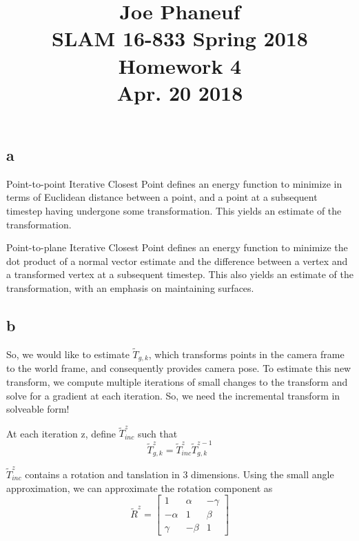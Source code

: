 \documentclass[12pt]{article}
\begin{document}
\title{Joe Phaneuf \\ SLAM 16-833 Spring 2018 Homework 4 \\ Apr. 20 2018 }
\date{}
\author{}
\maketitle

\newpage


\section{}
\subsection{a}
Point-to-point Iterative Closest Point defines an energy function to minimize in terms of Euclidean distance between a point, and a point at a subsequent timestep having undergone some transformation. This yields an estimate of the transformation. 

Point-to-plane Iterative Closest Point defines an energy function to minimize the dot product of a normal vector estimate and the difference between a vertex and a transformed vertex at a subsequent timestep. This also yields an estimate of the transformation, with an emphasis on maintaining surfaces.

\subsection{b}
So, we would like to estimate $\tilde{T}_{g,k}$, which transforms points in the camera frame to the world frame, and consequently provides camera pose.  
To estimate this new transform, we compute multiple iterations of small changes to the transform and solve for a gradient at each iteration. So, we need the incremental transform in solveable form!

At each iteration z, define $\tilde{T}_{inc}^{z}$ such that 
\begin{equation}
\tilde{T}_{g,k}^{z} = \tilde{T}_{inc}^{z} \tilde {T}_{g,k}^{z-1}
\end{equation}  
  
$\tilde{T}_{inc}^{z}$ contains a rotation and tanslation in 3 dimensions. Using the small angle approximation, we can approximate the rotation component as
\begin{equation}
\tilde{R}^{z} = 
\begin{bmatrix}
1 & \alpha & - \gamma \\
- \alpha & 1 & \beta \\
\gamma & - \beta & 1
\end{bmatrix}
\end{equation}
  
\end{document}
